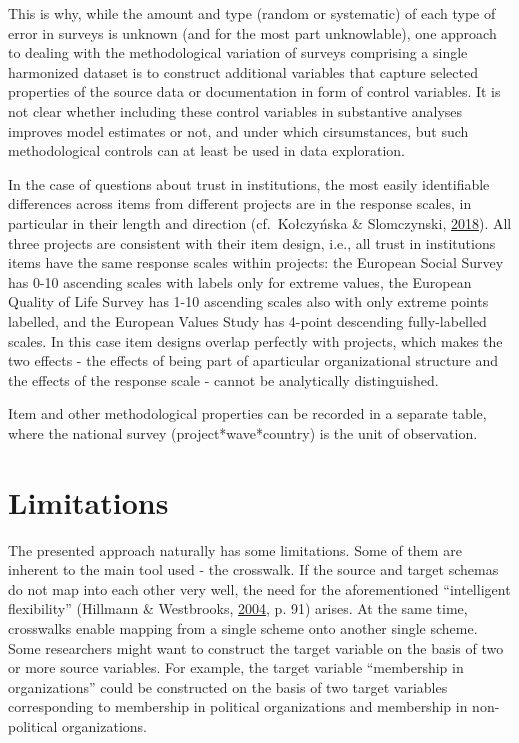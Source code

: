 \documentclass[12pt,]{article}
\begin{document}
This is why, while the amount and type (random or systematic) of each type of error in surveys is unknown (and for the most part unknowlable), one approach to dealing with the methodological variation of surveys comprising a single harmonized dataset is to construct additional variables that capture selected properties of the source data or documentation in form of control variables. It is not clear whether including these control variables in substantive analyses improves model estimates or not, and under which cirsumstances, but such methodological controls can at least be used in data exploration.

In the case of questions about trust in institutions, the most easily identifiable differences across items from different projects are in the response scales, in particular in their length and direction (cf.~Kołczyńska \& Slomczynski, \protect\hyperlink{ref-KolczynskaSlomczynski2018}{2018}). All three projects are consistent with their item design, i.e., all trust in institutions items have the same response scales within projects: the European Social Survey has 0-10 ascending scales with labels only for extreme values, the European Quality of Life Survey has 1-10 ascending scales also with only extreme points labelled, and the European Values Study has 4-point descending fully-labelled scales. In this case item designs overlap perfectly with projects, which makes the two effects - the effects of being part of aparticular organizational structure and the effects of the response scale - cannot be analytically distinguished.

Item and other methodological properties can be recorded in a separate table, where the national survey (project*wave*country) is the unit of observation.

\hypertarget{limitations}{%
\section{Limitations}\label{limitations}}

The presented approach naturally has some limitations. Some of them are inherent to the main tool used - the crosswalk. If the source and target schemas do not map into each other very well, the need for the aforementioned ``intelligent flexibility'' (Hillmann \& Westbrooks, \protect\hyperlink{ref-Hillmann2004}{2004}, p. 91) arises. At the same time, crosswalks enable mapping from a single scheme onto another single scheme. Some researchers might want to construct the target variable on the basis of two or more source variables. For example, the target variable ``membership in organizations'' could be constructed on the basis of two target variables corresponding to membership in political organizations and membership in non-political organizations.
\end{document}
